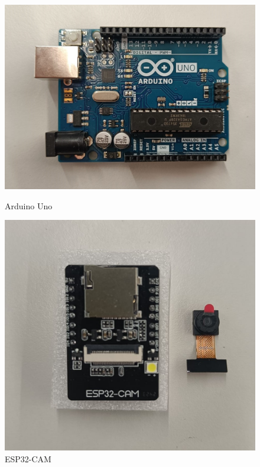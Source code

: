 \documentclass{article}
\begin{document}
\begin{figure}[H]
  \centering
  \begin{minipage}[b]{0.4\textwidth}
    \includegraphics[width=\textwidth]{Arduino_Uno.jpg}
    \caption{Arduino Uno}
  \end{minipage}
  \hfill
  \begin{minipage}[b]{0.4\textwidth}
    \includegraphics[width=\textwidth]{ESP32_cam.jpg}
    \caption{ESP32-CAM}
  \end{minipage}
\end{figure}
\end{document}
